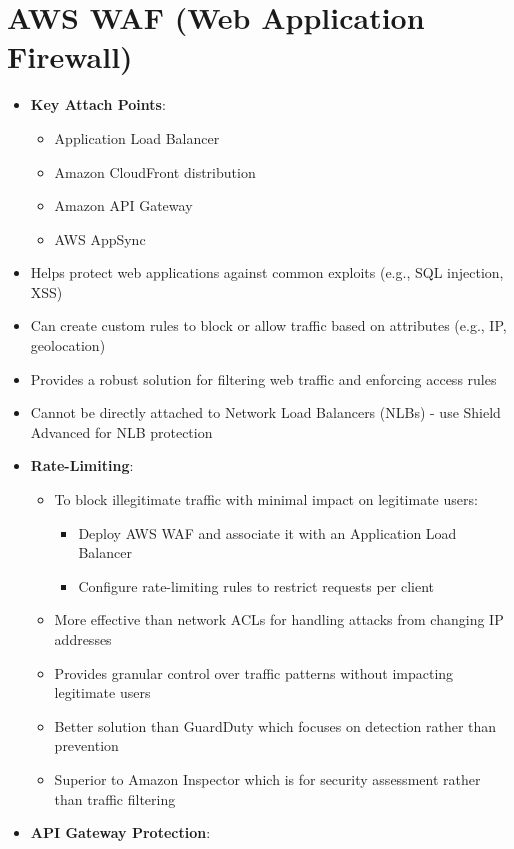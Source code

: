 \documentclass[11pt,a4paper]{report}
\begin{document}
\section{AWS WAF (Web Application Firewall)}

\begin{itemize}
  \item \textbf{Key Attach Points}:
\begin{itemize}
  \item Application Load Balancer
  \item Amazon CloudFront distribution
  \item Amazon API Gateway
  \item AWS AppSync
\end{itemize}
  \item Helps protect web applications against common exploits (e.g., SQL injection, XSS)
  \item Can create custom rules to block or allow traffic based on attributes (e.g., IP, geolocation)
  \item Provides a robust solution for filtering web traffic and enforcing access rules
  \item Cannot be directly attached to Network Load Balancers (NLBs) - use Shield Advanced for NLB protection
  \item \textbf{Rate-Limiting}:
\begin{itemize}
  \item To block illegitimate traffic with minimal impact on legitimate users:
\begin{itemize}
  \item Deploy AWS WAF and associate it with an Application Load Balancer
  \item Configure rate-limiting rules to restrict requests per client
\end{itemize}
  \item More effective than network ACLs for handling attacks from changing IP addresses
  \item Provides granular control over traffic patterns without impacting legitimate users
  \item Better solution than GuardDuty which focuses on detection rather than prevention
  \item Superior to Amazon Inspector which is for security assessment rather than traffic filtering
\end{itemize}
  \item \textbf{API Gateway Protection}:
\begin{itemize}

\end{itemize}
\end{itemize}
\end{document}

